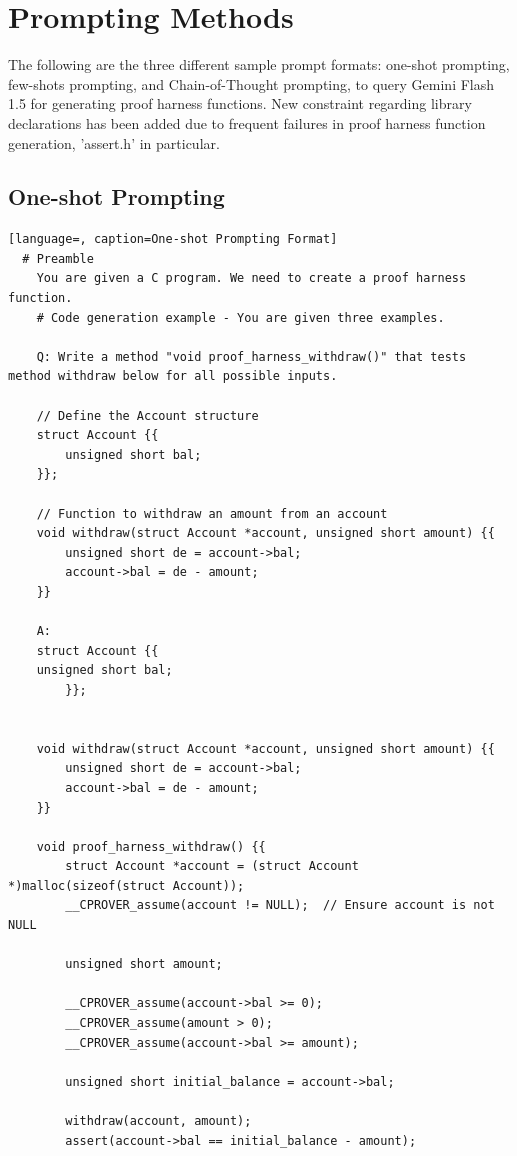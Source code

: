 \documentclass[onecolumn]{NobArticle}
\begin{document}
\vspace{11pt}
\section{Prompting Methods}
\label{sec:prompting_methods}
The following are the three different sample prompt formats: one-shot prompting, few-shots prompting, and Chain-of-Thought prompting, to query Gemini Flash 1.5 for generating proof harness functions. New constraint regarding library declarations has been added due to frequent failures in proof harness function generation, 'assert.h' in particular.

\subsection{One-shot Prompting}
\begin{lstlisting}[language=, caption=One-shot Prompting Format]
  # Preamble
    You are given a C program. We need to create a proof harness function.
    # Code generation example - You are given three examples.

    Q: Write a method "void proof_harness_withdraw()" that tests method withdraw below for all possible inputs.

    // Define the Account structure
    struct Account {{
        unsigned short bal;
    }};

    // Function to withdraw an amount from an account
    void withdraw(struct Account *account, unsigned short amount) {{ 
        unsigned short de = account->bal;
        account->bal = de - amount; 
    }}

    A:
    struct Account {{
    unsigned short bal;
        }};
    
    
    void withdraw(struct Account *account, unsigned short amount) {{
        unsigned short de = account->bal;
        account->bal = de - amount;
    }}
    
    void proof_harness_withdraw() {{
        struct Account *account = (struct Account *)malloc(sizeof(struct Account));
        __CPROVER_assume(account != NULL);  // Ensure account is not NULL
    
        unsigned short amount;
    
        __CPROVER_assume(account->bal >= 0);
        __CPROVER_assume(amount > 0);
        __CPROVER_assume(account->bal >= amount);
    
        unsigned short initial_balance = account->bal;
    
        withdraw(account, amount);
        assert(account->bal == initial_balance - amount);
    

\end{lstlisting}
\end{document}
